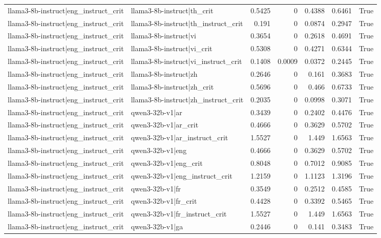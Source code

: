 \begin{table}
\begin{tabular}{l l r r r r l}
llama3-8b-instruct|eng_instruct_crit & llama3-8b-instruct|th_crit & 0.5425 & 0 & 0.4388 & 0.6461 & True \\
llama3-8b-instruct|eng_instruct_crit & llama3-8b-instruct|th_instruct_crit & 0.191 & 0 & 0.0874 & 0.2947 & True \\
llama3-8b-instruct|eng_instruct_crit & llama3-8b-instruct|vi & 0.3654 & 0 & 0.2618 & 0.4691 & True \\
llama3-8b-instruct|eng_instruct_crit & llama3-8b-instruct|vi_crit & 0.5308 & 0 & 0.4271 & 0.6344 & True \\
llama3-8b-instruct|eng_instruct_crit & llama3-8b-instruct|vi_instruct_crit & 0.1408 & 0.0009 & 0.0372 & 0.2445 & True \\
llama3-8b-instruct|eng_instruct_crit & llama3-8b-instruct|zh & 0.2646 & 0 & 0.161 & 0.3683 & True \\
llama3-8b-instruct|eng_instruct_crit & llama3-8b-instruct|zh_crit & 0.5696 & 0 & 0.466 & 0.6733 & True \\
llama3-8b-instruct|eng_instruct_crit & llama3-8b-instruct|zh_instruct_crit & 0.2035 & 0 & 0.0998 & 0.3071 & True \\
llama3-8b-instruct|eng_instruct_crit & qwen3-32b-v1|ar & 0.3439 & 0 & 0.2402 & 0.4476 & True \\
llama3-8b-instruct|eng_instruct_crit & qwen3-32b-v1|ar_crit & 0.4666 & 0 & 0.3629 & 0.5702 & True \\
llama3-8b-instruct|eng_instruct_crit & qwen3-32b-v1|ar_instruct_crit & 1.5527 & 0 & 1.449 & 1.6563 & True \\
llama3-8b-instruct|eng_instruct_crit & qwen3-32b-v1|eng & 0.4666 & 0 & 0.3629 & 0.5702 & True \\
llama3-8b-instruct|eng_instruct_crit & qwen3-32b-v1|eng_crit & 0.8048 & 0 & 0.7012 & 0.9085 & True \\
llama3-8b-instruct|eng_instruct_crit & qwen3-32b-v1|eng_instruct_crit & 1.2159 & 0 & 1.1123 & 1.3196 & True \\
llama3-8b-instruct|eng_instruct_crit & qwen3-32b-v1|fr & 0.3549 & 0 & 0.2512 & 0.4585 & True \\
llama3-8b-instruct|eng_instruct_crit & qwen3-32b-v1|fr_crit & 0.4428 & 0 & 0.3392 & 0.5465 & True \\
llama3-8b-instruct|eng_instruct_crit & qwen3-32b-v1|fr_instruct_crit & 1.5527 & 0 & 1.449 & 1.6563 & True \\
llama3-8b-instruct|eng_instruct_crit & qwen3-32b-v1|ga & 0.2446 & 0 & 0.141 & 0.3483 & True \\

\end{tabular}
\end{table}
